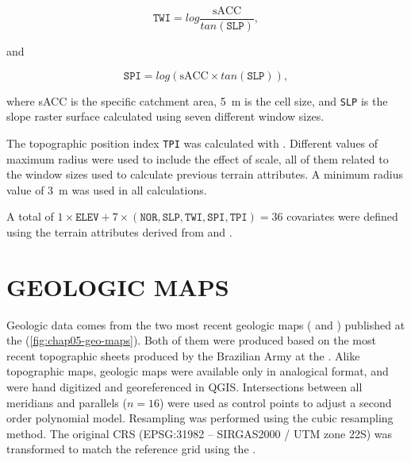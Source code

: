 \begin{equation}
 \texttt{TWI} = log \dfrac{\text{sACC}}{tan(\texttt{SLP})},
\end{equation}\label{eq:TWI}

\noindent and

\begin{equation}
 \texttt{SPI} = log(\text{sACC} \times tan(\texttt{SLP})),
\end{equation}\label{eq:SPI}

\noindent where sACC is the specific catchment area, \SI{5}{\m} is the cell size, and \texttt{SLP} is the 
slope 
raster surface calculated using seven different window sizes.

The topographic position index \texttt{TPI} was calculated with . Different values of 
maximum radius were used to include the effect of scale, all of them related to the window sizes used to 
calculate previous terrain attributes. A minimum radius value of \SI{3}{\m} was used in all calculations.

A total of $1 \times \texttt{ELEV} + 7 \times (\texttt{NOR}, \texttt{SLP}, \texttt{TWI}, \texttt{SPI}, 
\texttt{TPI}) = 36$ covariates 
were defined using the terrain attributes derived from \demOld{} and \demNew{}.

\section{GEOLOGIC MAPS}
\label{sec:chap05-geo-maps}

Geologic data comes from the two most recent geologic maps (\geoOld{} and \geoNew{}) published at the 
 \cite{GasparettoEtAl1988, MacielFilho1990} (\autoref{fig:chap05-geo-maps}). Both of 
them were produced based on the most recent topographic sheets produced by the Brazilian Army at the 
 \cite{DSG1980, DSG1992, DSG1992a}. Alike topographic maps, geologic maps were 
available only in analogical format, and were hand digitized and georeferenced in QGIS. Intersections 
between all meridians and parallels ($n = 16$) were used as control points to adjust a second order polynomial 
model. Resampling was performed using the cubic resampling method. The original CRS 
(EPSG:31982 -- SIRGAS2000 / UTM zone 22S) was transformed to match the reference grid using the 
 \cite{BivandEtAl2013a}.

